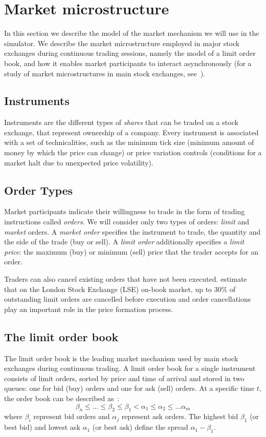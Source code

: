 \section{Market microstructure}
\label{Chapters/Background/Market-Microstructure}

In this section we describe the model of the market mechanism we will use in the simulator. We describe the market microstructure employed in major stock exchanges during continuous trading sessions, namely the model of a limit order book, and how it enables market participants to interact asynchronously (for a study of market microstructures in main stock exchanges, see~\cite{Comerton2004}). 


\subsection{Instruments}
Instruments are the different types of \textit{shares} that can be traded on a stock exchange, that represent ownership of a company. Every instrument is associated with a set of technicalities, such as the minimum tick size (minimum amount of money by which the price can change) or price variation controls (conditions for a market halt due to unexpected price volatility).

\subsection{Order Types}
Market participants indicate their willingness to trade in the form of trading instructions called \textit{orders}. We will consider only two types of orders: \textit{limit} and \textit{market} orders. A \textit{market order} specifies the instrument to trade, the quantity and the side of the trade (buy or sell). A \textit{limit order} additionally specifies a \textit{limit price}: the maximum (buy) or minimum (sell) price that the trader accepts for an order. 

Traders can also cancel existing orders that have not been executed. \citet{Lilo2004} estimate that on the London Stock Exchange (LSE) on-book market, up to 30\% of outstanding limit orders are cancelled before execution and order cancellations play an important role in the price formation process. 

\subsection{The limit order book}
The limit order book is the leading market mechanism used by main stock exchanges during continuous trading. A limit order book for a single instrument consists of limit orders, sorted by price and time of arrival and stored in two queues: one for bid (buy) orders and one for ask (sell) orders. At a specific time $t$, the order book can be described as~\cite{Gilles2006}: 
\begin{equation*}
\beta_n \leq \ldots \leq \beta_2 \leq \beta_1 < \alpha_1 \leq \alpha_2 \leq \ldots \alpha_m
\end{equation*}
where $\beta_i$ represent bid orders and $\alpha_j$ represent ask orders. The highest bid $\beta_1$ (or best bid) and lowest ask $\alpha_1$ (or best ask) define the spread $\alpha_1 - \beta_1$.


